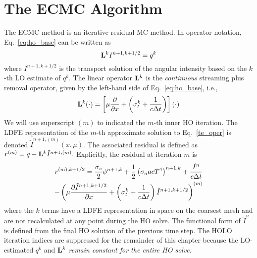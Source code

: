 \section{The ECMC Algorithm}

The ECMC method is an iterative residual MC method. 
In operator notation, Eq.~\eqref{eq:ho_base} can be written as
\begin{equation}\label{te_oper}
\mathbf{L}^k I^{n+1,k+1/2}  = q^{k}
\end{equation}
where $I^{n+1,k+1/2}$ is the transport solution of the angular intensity based on the
$k$-th LO estimate of $q^k$.
The linear operator $\mathbf{L}^k$ is the \emph{continuous} streaming plus
removal operator, given by the left-hand
side of Eq.~\eqref{eq:ho_base}, i.e.,
\begin{equation}
    \mathbf{L}^k(\cdot) = \left[\mu \frac{\partial }{\partial x} + \left(\sigma_t^k + \frac{1}{c \Delta t
    }\right)\right] \left(\cdot\right)
\end{equation}
We will use superscript $(m)$ to indicated the $m$-th inner HO iteration.  The LDFE
representation of the $m$-th
approximate solution to Eq.~\eqref{te_oper} is denoted
$\tilde{I}^{n+1,(m)}(x,\mu)$.    
The associated residual is defined as $r^{(m)} = q - \mathbf{L}^k\tilde{I}^{n+1,(m)}.$ 
Explicitly, the residual at iteration $m$ is
\begin{multline}\label{eq:resid}
r^{(m),k+1/2} = \frac{\sigma_s}{2} \phi^{n+1,k} +\frac{1}{2} \left(\sigma_a a c T^4
\right)^{n+1,k} + \frac{\tilde{I}^n}{c \Delta t } \\ -
\left(\mu \frac{\partial \tilde{I}^{n+1,k+1/2}}{\partial x} +
\left(\sigma_t^k + \frac{1}{c \Delta t }\right) \tilde{I}^{n+1,k+1/2}\right)^{(m)}
\end{multline}
where the $k$ terms have a LDFE representation in space on the coarsest mesh and are not recalculated at any point during
the HO solve. The functional form of $\tilde{I}^n$ is defined from the final HO
solution of the previous time step.  The HOLO iteration indices are suppressed for the
remainder of this chapter because the LO-estimated $q^{k}$ and $\mathbf{L}^{k}$
\emph{remain constant for the entire HO solve}.

